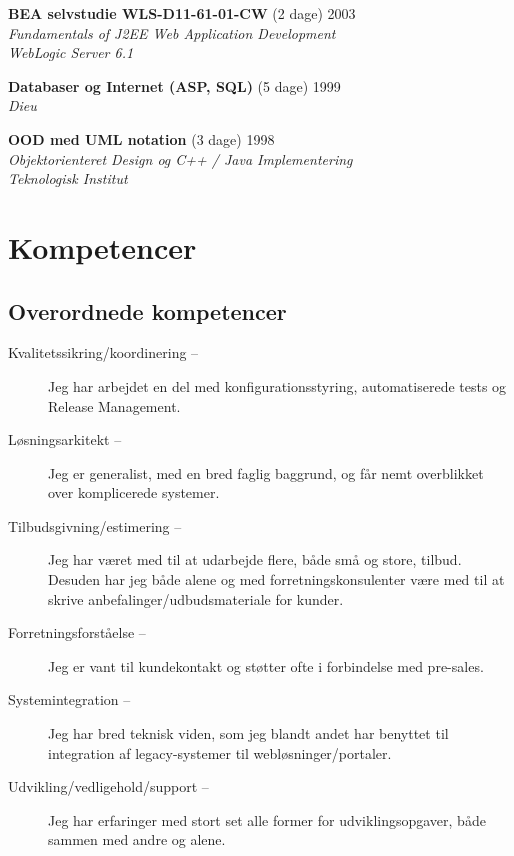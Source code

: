 \documentclass[a4paper,11pt]{article}
\begin{document}
\textbf{BEA selvstudie WLS-D11-61-01-CW} \hfill (2 dage) 2003 \\
\textsl{Fundamentals of J2EE Web Application Development\\WebLogic Server 6.1}


\textbf{Databaser og Internet (ASP, SQL)} \hfill (5 dage) 1999 \\
\textsl{Dieu}

\textbf{OOD med UML notation} \hfill (3 dage) 1998 \\
\textsl{Objektorienteret Design og C++ / Java Implementering\\Teknologisk Institut}


\section*{Kompetencer}

\subsection*{Overordnede kompetencer}

\begin{description}

  \item[Kvalitetssikring/koordinering --] Jeg har arbejdet en del
    med konfigurationsstyring, automatiserede tests og Release
    Management.

  \item[Løsningsarkitekt --] Jeg er generalist, med en bred faglig
    baggrund, og får nemt overblikket over komplicerede systemer.

  \item[Tilbudsgivning/estimering --] Jeg har været med til at
    udarbejde flere, både små og store, tilbud. Desuden har jeg både
    alene og med forretningskonsulenter være med til at skrive
    anbefalinger/udbudsmateriale for kunder.

  \item[Forretningsforståelse --] Jeg er vant til kundekontakt og
    støtter ofte i forbindelse med pre-sales.

  \item[Systemintegration --] Jeg har bred teknisk viden, som jeg
    blandt andet har benyttet til integration af legacy-systemer til
    webløsninger/portaler.

  \item[Udvikling/vedligehold/support --] Jeg har erfaringer med
    stort set alle former for udviklingsopgaver, både sammen med
    andre og alene.

\end{description}
\end{document}
